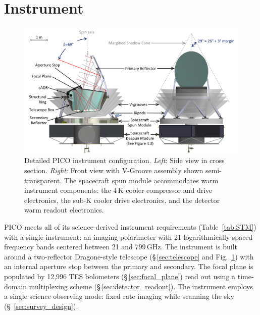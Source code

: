 \newcommand\pdeg{.\!\!\degree}
\newcommand\parcm{.\!\!'}

\section{Instrument}
\label{sec:instrument} %

\begin{figure}
\begin{center}
\includegraphics[width=6.25in]{figures/InstrumentCAD.png}
\vspace{-0.1in}
\caption{\captiontext
Detailed PICO instrument configuration. \textit{Left}: Side view in cross section. \textit{Right}: Front view with V-Groove assembly shown semi-transparent.  The spacecraft spun module accommodates warm instrument components: the 4\,K cooler compressor and drive electronics, the sub-K cooler drive electronics, and the detector warm readout electronics.
\label{fig:InstrumentCAD}}
\end{center}
\vspace{-0.15in}
\end{figure}

PICO meets all of its science-derived instrument requirements (Table~\ref{tab:STM}) with a single instrument: an imaging polarimeter with 21 logarithmically spaced frequency bands centered between 21 and 799\,GHz. The instrument is built around a two-reflector Dragone-style telescope (\S\,\ref{sec:telescope} and Fig.~\ref{fig:InstrumentCAD}) with an internal aperture stop between the primary and secondary. The focal plane is populated by 12,996 \ac{TES} bolometers (\S\,\ref{sec:focal_plane}) read out using a time-domain multiplexing scheme (\S\,\ref{sec:detector_readout}). The instrument employs a single science observing mode: fixed rate imaging while scanning the sky (\S~\ref{sec:survey_design}).

